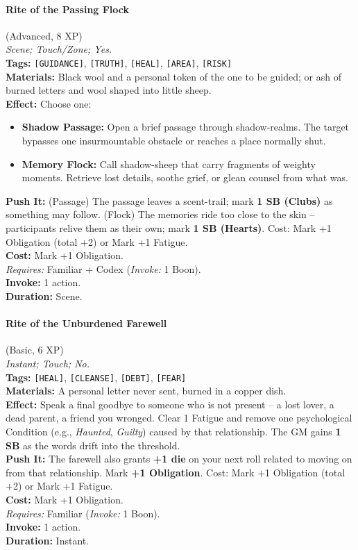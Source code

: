 \paragraph{Rite of the Passing Flock} (Advanced, 8 XP) \hfill \\
\emph{Scene; Touch/Zone; Yes.} \\
\textbf{Tags:} \texttt{[GUIDANCE]}, \texttt{[TRUTH]}, \texttt{[HEAL]}, \texttt{[AREA]}, \texttt{[RISK]} \\
\textbf{Materials:} Black wool and a personal token of the one to be guided; or ash of burned letters and wool shaped into little sheep. \\
\textbf{Effect:} Choose one:
\begin{itemize}
  \item \textbf{Shadow Passage:} Open a brief passage through shadow-realms. The target bypasses one insurmountable obstacle or reaches a place normally shut.
  \item \textbf{Memory Flock:} Call shadow-sheep that carry fragments of weighty moments. Retrieve lost details, soothe grief, or glean counsel from what was.
\end{itemize}
\textbf{Push It:} (Passage) The passage leaves a scent-trail; mark \textbf{1 SB (Clubs)} as something may follow. (Flock) The memories ride too close to the skin -- participants relive them as their own; mark \textbf{1 SB (Hearts)}. Cost: Mark +1 Obligation (total +2) or Mark +1 Fatigue. \\
\textbf{Cost:} Mark +1 Obligation. \\
\textit{Requires:} Familiar + Codex (\textit{Invoke:} 1 Boon). \\
\textbf{Invoke:} 1 action. \\
\textbf{Duration:} Scene.

\paragraph{Rite of the Unburdened Farewell} (Basic, 6 XP) \hfill \\
\emph{Instant; Touch; No.} \\
\textbf{Tags:} \texttt{[HEAL]}, \texttt{[CLEANSE]}, \texttt{[DEBT]}, \texttt{[FEAR]} \\
\textbf{Materials:} A personal letter never sent, burned in a copper dish. \\
\textbf{Effect:} Speak a final goodbye to someone who is not present -- a lost lover, a dead parent, a friend you wronged. Clear 1 Fatigue and remove one psychological Condition (e.g., \textit{Haunted}, \textit{Guilty}) caused by that relationship. The GM gains \textbf{1 SB} as the words drift into the threshold. \\
\textbf{Push It:} The farewell also grants \textbf{+1 die} on your next roll related to moving on from that relationship. Mark \textbf{+1 Obligation}. Cost: Mark +1 Obligation (total +2) or Mark +1 Fatigue. \\
\textbf{Cost:} Mark +1 Obligation. \\
\textit{Requires:} Familiar (\textit{Invoke:} 1 Boon). \\
\textbf{Invoke:} 1 action. \\
\textbf{Duration:} Instant.

